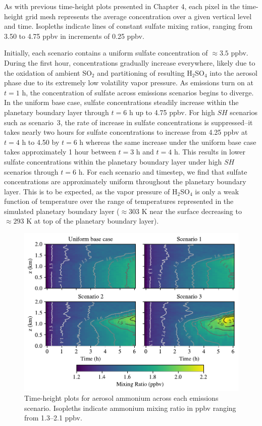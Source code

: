 As with previous time-height plots presented in Chapter 4, each pixel in the time-height grid mesh represents the average concentration over a given vertical level and time. Isopleths indicate lines of constant sulfate mixing ratios, ranging from 3.50 to 4.75 ppbv in increments of 0.25 ppbv.

Initially, each scenario contains a uniform sulfate concentration of $\approx3.5$ ppbv. During the first hour, concentrations gradually increase everywhere, likely due to the oxidation of ambient SO$_2$ and partitioning of resulting H$_2$SO$_4$ into the aerosol phase due to its extremely low volatility vapor pressure. As emissions turn on at $t=1$ h, the concentration of sulfate across emissions scenarios begins to diverge. In the uniform base case, sulfate concentrations steadily increase within the planetary boundary layer through $t=6$ h up to 4.75 ppbv. For high $SH$ scenarios such as scenario~3, the rate of increase in sulfate concentrations is suppressed--it takes nearly two hours for sulfate concentrations to increase from 4.25 ppbv at $t=4$ h to 4.50 by $t=6$ h whereas the same increase under the uniform base case takes approximately 1 hour between $t=3$ h and $t=4$ h. This results in lower sulfate concentrations within the planetary boundary layer under high $SH$ scenarios through $t=6$ h. For each scenario and timestep, we find that sulfate concentrations are approximately uniform throughout the planetary boundary layer. This is to be expected, as the vapor pressure of H$_2$SO$_4$ is only a weak function of temperature over the range of temperatures represented in the simulated planetary boundary layer ($\approx303$ K near the surface decreasing to $\approx293$ K at top of the planetary boundary layer).

\begin{figure}[!t]
  \centering
    \includegraphics[width=\textwidth]{figures/chapter5/height-time-pmc_NH4-four-scenarios.pdf}
    \caption{Time-height plots for aerosol ammonium across each emissions scenario. Isopleths indicate ammonium mixing ratio in ppbv ranging from 1.3--2.1 ppbv.}
    \label{fig:ht-nh4}
\end{figure}


